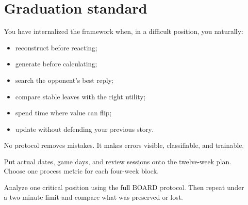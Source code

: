 \section{Graduation standard}
You have internalized the framework when, in a difficult position, you naturally:

\begin{itemize}[leftmargin=1.4em]
\item reconstruct before reacting;
\item generate before calculating;
\item search the opponent's best reply;
\item compare stable leaves with the right utility;
\item spend time where value can flip;
\item update without defending your previous story.
\end{itemize}

No protocol removes mistakes. It makes errors visible, classifiable, and trainable.

\begin{exercise}
Put actual dates, game days, and review sessions onto the twelve-week plan. Choose one process metric for each four-week block.
\end{exercise}

\begin{exercise}
Analyze one critical position using the full BOARD protocol. Then repeat under a two-minute limit and compare what was preserved or lost.
\end{exercise}

